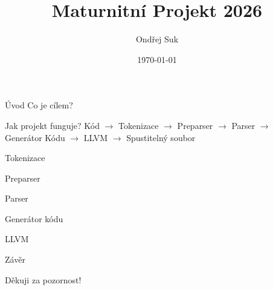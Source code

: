 \documentclass[12pt, a4paper, titlepage]{beamer}
\title{Maturnitní Projekt 2026} %
\author{Ondřej Suk}
\date{\today}
\begin{document}
\frame{\titlepage}

\begin{frame}{Úvod}
Co je cílem?
\end{frame}
\begin{frame}{Jak projekt funguje?}
Kód $\rightarrow$ Tokenizace $\rightarrow$ Preparser $\rightarrow$ Parser $\rightarrow$ Generátor Kódu $\rightarrow$ LLVM $\rightarrow$ Spustitelný soubor
\end{frame}
\begin{frame}{Tokenizace}
\end{frame}
\begin{frame}{Preparser}
\end{frame}
\begin{frame}{Parser}
\end{frame}
\begin{frame}{Generátor kódu}
\end{frame}
\begin{frame}{LLVM}
\end{frame}
\begin{frame}{Závěr}
\end{frame}
\begin{frame}[plain]
  \centering\Huge Děkuji za pozornost!
\end{frame}
\end{document}
